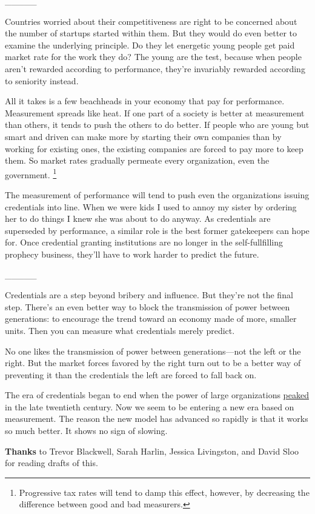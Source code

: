 \_\_\_\_\_

Countries worried about their competitiveness are right to be concerned
about the number of startups started within them. But they would do even
better to examine the underlying principle. Do they let energetic young
people get paid market rate for the work they do? The young are the
test, because when people aren't rewarded according to performance,
they're invariably rewarded according to seniority instead.

All it takes is a few beachheads in your economy that pay for
performance. Measurement spreads like heat. If one part of a society is
better at measurement than others, it tends to push the others to do
better. If people who are young but smart and driven can make more by
starting their own companies than by working for existing ones, the
existing companies are forced to pay more to keep them. So market rates
gradually permeate every organization, even the government.
\footnote{Progressive tax rates will tend to damp this effect, however, by
decreasing the difference between good and bad measurers.}

The measurement of performance will tend to push even the organizations
issuing credentials into line. When we were kids I used to annoy my
sister by ordering her to do things I knew she was about to do anyway.
As credentials are superseded by performance, a similar role is the best
former gatekeepers can hope for. Once credential granting institutions
are no longer in the self-fullfilling prophecy business, they'll have to
work harder to predict the future.

\_\_\_\_\_

Credentials are a step beyond bribery and influence. But they're not the
final step. There's an even better way to block the transmission of
power between generations: to encourage the trend toward an economy made
of more, smaller units. Then you can measure what credentials merely
predict.

No one likes the transmission of power between generations---not the
left or the right. But the market forces favored by the right turn out
to be a better way of preventing it than the credentials the left are
forced to fall back on.

The era of credentials began to end when the power of large
organizations \href{highres.html}{peaked} in the late twentieth century.
Now we seem to be entering a new era based on measurement. The reason
the new model has advanced so rapidly is that it works so much better.
It shows no sign of slowing.


\textbf{Thanks} to Trevor Blackwell, Sarah Harlin, Jessica Livingston,
and David Sloo for reading drafts of this.